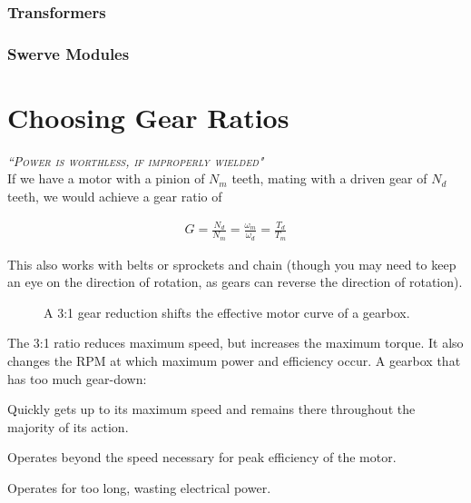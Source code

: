 \documentclass[10pt,letterpaper]{book}
\begin{document}
\subsection{Transformers}
\subsection{Swerve Modules}



\chapter{Choosing Gear Ratios}

 {\slshape \scshape ``Power is worthless, if improperly wielded"}
 \\

If we have a motor with a pinion of $N_m$ teeth, mating with a driven gear of $N_d$ teeth, we would achieve a gear ratio of

\begin{align}
  G = \frac{N_d}{N_m} = \frac{\omega_m}{\omega_d} = \frac{T_d}{T_m}
\end{align}

This also works with belts or sprockets and chain (though you may need to keep an eye on the direction of rotation, as gears can reverse the direction of rotation).


\begin{figure}[H] \centering
{}
\caption{A 3:1 gear reduction shifts the effective motor curve of a gearbox.}
\end{figure}

The 3:1 ratio reduces maximum speed, but increases the maximum torque. It also changes the RPM at which maximum power and efficiency occur. A gearbox that has too much gear-down:
\begin{asparaitem}
	\item Quickly gets up to its maximum speed and remains there throughout the majority of its action.
	\item Operates beyond the speed necessary for peak efficiency of the motor.
	\item Operates for too long, wasting electrical power.
\end{asparaitem}
\end{document}
